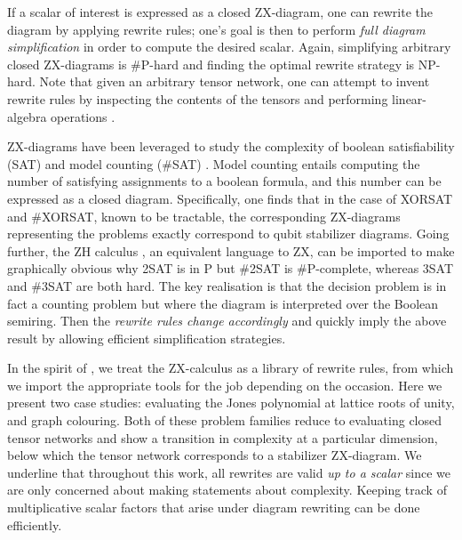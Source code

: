 If a scalar of interest is expressed as a closed ZX-diagram,
one can rewrite the diagram by applying rewrite rules; one's goal is then to perform \emph{full diagram simplification} in order to compute the desired scalar.
Again, simplifying arbitrary closed ZX-diagrams is \#P-hard and finding the optimal rewrite strategy is NP-hard.
Note that
given an arbitrary tensor network, one can attempt to invent rewrite rules by inspecting the contents of the tensors and performing linear-algebra operations \cite{gray2020hyperoptimized}.


ZX-diagrams have been leveraged to study the complexity of boolean satisfiability (SAT) and model counting (\#SAT) \cite{debeaudrap2020tensor}.
Model counting entails computing the number of satisfying assignments to a boolean formula,
and this number can be expressed as a closed diagram.
Specifically, one finds that in the case of XORSAT and \#XORSAT,
known to be tractable,
the corresponding ZX-diagrams representing the problems exactly correspond to qubit stabilizer diagrams.
Going further, the ZH calculus \cite{backens2018zh}, an equivalent language to ZX, can be imported to make graphically obvious
why 2SAT is in P but \#2SAT is \#P-complete, whereas 3SAT and \#3SAT are both hard.
The key realisation is that the decision problem is in fact a counting problem
but where the diagram is interpreted over the Boolean semiring.
Then the \emph{rewrite rules change accordingly} and quickly imply the above result by allowing efficient simplification strategies.

In the spirit of \cite{debeaudrap2020tensor}, we treat the ZX-calculus as a library of rewrite rules, from which we import the appropriate tools for the job depending on the occasion.
Here we present two case studies: evaluating the Jones polynomial at lattice roots of unity, and graph colouring.
Both of these problem families reduce to evaluating
closed tensor networks and show a transition in complexity
at a particular dimension, below which the tensor network corresponds to a stabilizer ZX-diagram.
We underline that throughout this work, all rewrites are valid
\emph{up to a scalar}
since we are only concerned about making statements about complexity.
Keeping track of multiplicative scalar factors that arise under diagram rewriting can be done efficiently.
